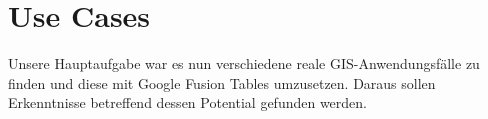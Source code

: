 

\chapter*{Use Cases}
Unsere Hauptaufgabe war es nun verschiedene reale GIS-Anwendungsfälle zu finden und diese mit Google Fusion Tables umzusetzen. Daraus sollen Erkenntnisse betreffend dessen Potential gefunden werden.





